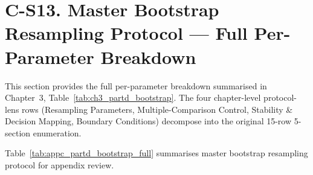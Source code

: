 \section*{C-S13. Master Bootstrap Resampling Protocol --- Full Per-Parameter Breakdown}
\label{sec:appc_partd_bootstrap_full}

\noindent This section provides the full per-parameter breakdown summarised in Chapter~3, Table~\ref{tab:ch3_partd_bootstrap}. The four chapter-level protocol-lens rows (Resampling Parameters, Multiple-Comparison Control, Stability \& Decision Mapping, Boundary Conditions) decompose into the original 15-row 5-section enumeration.

\noindent Table~\ref{tab:appc_partd_bootstrap_full} summarises master bootstrap resampling protocol for appendix review.

